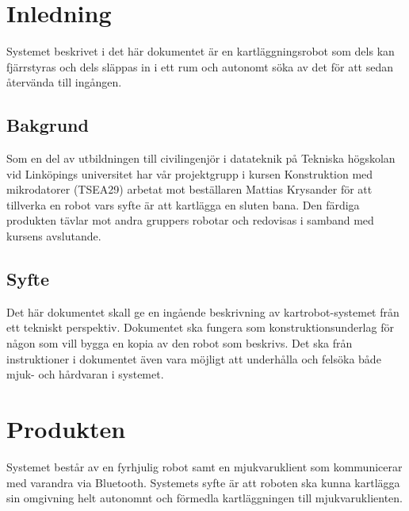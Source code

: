 \documentclass{article}
\begin{document}
\clearpage
\section{Inledning}
Systemet beskrivet i det här dokumentet är en kartläggningsrobot som dels kan fjärrstyras och dels släppas in i ett rum och autonomt söka av det för att sedan återvända till ingången.
\subsection{Bakgrund}
Som en del av utbildningen till civilingenjör i datateknik på Tekniska högskolan vid Linköpings universitet har vår projektgrupp i kursen Konstruktion med mikrodatorer (TSEA29) arbetat mot beställaren Mattias Krysander för att tillverka en robot vars syfte är att kartlägga en sluten bana. Den färdiga produkten tävlar mot andra gruppers robotar och redovisas i samband med kursens avslutande.

\subsection{Syfte}
Det här dokumentet skall ge en ingående beskrivning av kartrobot-systemet från ett tekniskt perspektiv. Dokumentet ska fungera som konstruktionsunderlag för någon som vill bygga en kopia av den robot som beskrivs. Det ska från instruktioner i dokumentet även vara möjligt att underhålla och felsöka både mjuk- och hårdvaran i systemet.

\clearpage
\section{Produkten}

Systemet består av en fyrhjulig robot samt en mjukvaruklient som kommunicerar med varandra via Bluetooth. Systemets syfte är att roboten ska kunna kartlägga sin omgivning helt autonomnt och förmedla kartläggningen till mjukvaruklienten. 
\end{document}
